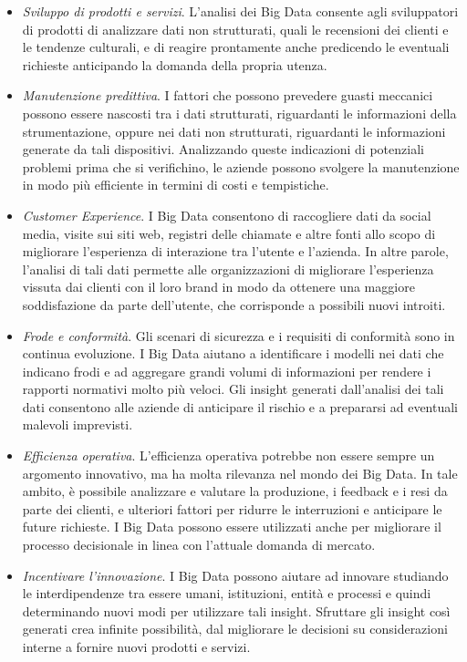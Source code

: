 \begin{itemize}
    \item \textit{Sviluppo di prodotti e servizi}. L'analisi dei Big Data consente agli sviluppatori di prodotti di analizzare dati non strutturati, quali le recensioni dei clienti e le tendenze culturali, e di reagire prontamente anche predicendo le eventuali richieste anticipando la domanda della propria utenza.
    \item \textit{Manutenzione predittiva}. I fattori che possono prevedere guasti meccanici possono essere nascosti tra i dati strutturati, riguardanti le informazioni della strumentazione, oppure nei dati non strutturati, riguardanti le informazioni generate da tali dispositivi. Analizzando queste indicazioni di potenziali problemi prima che si verifichino, le aziende possono svolgere la manutenzione in modo più efficiente in termini di costi e tempistiche.
    \item \textit{Customer Experience}. I Big Data consentono di raccogliere dati da social media, visite sui siti web, registri delle chiamate e altre fonti allo scopo di migliorare l'esperienza di interazione tra l'utente e l'azienda. In altre parole, l'analisi di tali dati permette alle organizzazioni di migliorare l'esperienza vissuta dai clienti con il loro brand in modo da ottenere una maggiore soddisfazione da parte dell'utente, che corrisponde a possibili nuovi introiti.
    \item \textit{Frode e conformità}. Gli scenari di sicurezza e i requisiti di conformità sono in continua evoluzione. I Big Data aiutano a identificare i modelli nei dati che indicano frodi e ad aggregare grandi volumi di informazioni per rendere i rapporti normativi molto più veloci. Gli insight generati dall'analisi dei tali dati consentono alle aziende di anticipare il rischio e a prepararsi ad eventuali malevoli imprevisti.
    \item \textit{Efficienza operativa}. L'efficienza operativa potrebbe non essere sempre un argomento innovativo, ma ha molta rilevanza nel mondo dei Big Data. In tale ambito, è possibile analizzare e valutare la produzione, i feedback e i resi da parte dei clienti, e ulteriori fattori per ridurre le interruzioni e anticipare le future richieste. I Big Data possono essere utilizzati anche per migliorare il processo decisionale in linea con l'attuale domanda di mercato.
    \item \textit{Incentivare l'innovazione}. I Big Data possono aiutare ad innovare studiando le interdipendenze tra essere umani, istituzioni, entità e processi e quindi determinando nuovi modi per utilizzare tali insight. Sfruttare gli insight così generati crea infinite possibilità, dal migliorare le decisioni su considerazioni interne a fornire nuovi prodotti e servizi.
\end{itemize}

